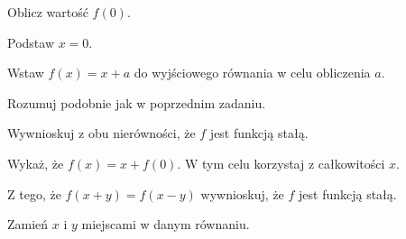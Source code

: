 

\begin{hints_list}
	\item *
	\item Oblicz wartość $f(0)$.
	\item Podstaw $x = 0$.
	\item *
	\item Wstaw $f(x) = x + a$ do wyjściowego równania w celu obliczenia $a$.
	\item Rozumuj podobnie jak w poprzednim zadaniu.
	\item Wywnioskuj z obu nierówności, że $f$ jest funkcją stałą.
	\item Wykaż, że $f(x) = x + f(0)$. W tym celu korzystaj z całkowitości $x$.
	\item Z tego, że $f(x + y) = f(x - y)$ wywnioskuj, że $f$ jest funkcją stałą.
	\item Zamień $x$ i $y$ miejscami w danym równaniu.
\end{hints_list}
